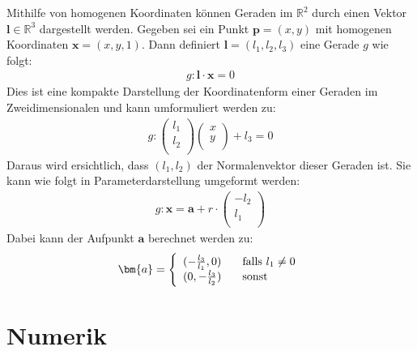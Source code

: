 Mithilfe von homogenen Koordinaten können Geraden im $\mathbb{R}^2$ durch einen Vektor $\bm{l}\in\mathbb{R}^3$ dargestellt werden. Gegeben sei ein Punkt $\bm{p} = (x,y)$ mit homogenen Koordinaten $\bm{x} = (x,y,1)$. Dann definiert $\bm{l} = (l_1,l_2,l_3)$ eine Gerade $g$ wie folgt:
\begin{eqnarray}
g : \bm{l}\cdot\bm{x} = 0\nonumber
\end{eqnarray}
Dies ist eine kompakte Darstellung der Koordinatenform einer Geraden im Zweidimensionalen und kann umformuliert werden zu:
\begin{eqnarray}
g : \left(
\begin{array}{c}
l_1\\
l_2\\
\end{array}
\right)
\left(
\begin{array}{c}
x\\
y\\
\end{array}
\right) + l_3 = 0
\nonumber
\end{eqnarray}
Daraus wird ersichtlich, dass $(l_1,l_2)$ der Normalenvektor dieser Geraden ist. Sie kann wie folgt in Parameterdarstellung umgeformt werden:
\begin{eqnarray}
g : \bm{x} = \bm{a} + r\cdot
\left(
\begin{array}{c}
-l_2\\
l_1\\
\end{array}
\right)
\nonumber
\end{eqnarray}
Dabei kann der Aufpunkt $\bm{a}$ berechnet werden zu:
\begin{eqnarray}
\bm{a} = \left\{
\begin{array}{llll}
(-\frac{l_3}{l_1},0) & \hspace{0.3cm} {\rm falls}\ l_1 \neq 0\\
(0,-\frac{l_3}{l_2}) & \hspace{0.3cm} {\rm sonst}
\end{array}
\right.
\end{eqnarray}

\clearpage

\section{Numerik}
